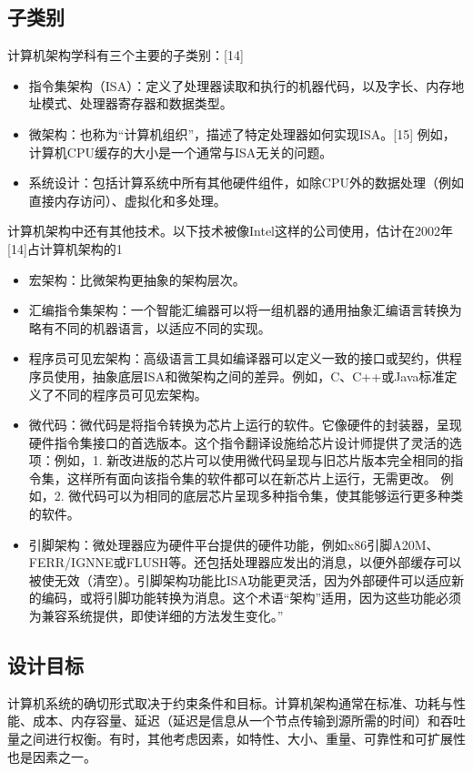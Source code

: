 \subsection{子类别}  
计算机架构学科有三个主要的子类别：[14]
\begin{itemize}
\item 指令集架构（ISA）：定义了处理器读取和执行的机器代码，以及字长、内存地址模式、处理器寄存器和数据类型。
\item 微架构：也称为“计算机组织”，描述了特定处理器如何实现ISA。[15] 例如，计算机CPU缓存的大小是一个通常与ISA无关的问题。
\item 系统设计：包括计算系统中所有其他硬件组件，如除CPU外的数据处理（例如直接内存访问）、虚拟化和多处理。
\end{itemize}
计算机架构中还有其他技术。以下技术被像Intel这样的公司使用，估计在2002年[14]占计算机架构的1%
\begin{itemize}
\item 宏架构：比微架构更抽象的架构层次。
\item 汇编指令集架构：一个智能汇编器可以将一组机器的通用抽象汇编语言转换为略有不同的机器语言，以适应不同的实现。
\item 程序员可见宏架构：高级语言工具如编译器可以定义一致的接口或契约，供程序员使用，抽象底层ISA和微架构之间的差异。例如，C、C++或Java标准定义了不同的程序员可见宏架构。
\item 微代码：微代码是将指令转换为芯片上运行的软件。它像硬件的封装器，呈现硬件指令集接口的首选版本。这个指令翻译设施给芯片设计师提供了灵活的选项：例如，1. 新改进版的芯片可以使用微代码呈现与旧芯片版本完全相同的指令集，这样所有面向该指令集的软件都可以在新芯片上运行，无需更改。 例如，2. 微代码可以为相同的底层芯片呈现多种指令集，使其能够运行更多种类的软件。
\item 引脚架构：微处理器应为硬件平台提供的硬件功能，例如x86引脚A20M、FERR/IGNNE或FLUSH等。还包括处理器应发出的消息，以便外部缓存可以被使无效（清空）。引脚架构功能比ISA功能更灵活，因为外部硬件可以适应新的编码，或将引脚功能转换为消息。这个术语“架构”适用，因为这些功能必须为兼容系统提供，即使详细的方法发生变化。”
\end{itemize}
\subsection{设计目标}  
计算机系统的确切形式取决于约束条件和目标。计算机架构通常在标准、功耗与性能、成本、内存容量、延迟（延迟是信息从一个节点传输到源所需的时间）和吞吐量之间进行权衡。有时，其他考虑因素，如特性、大小、重量、可靠性和可扩展性也是因素之一。

